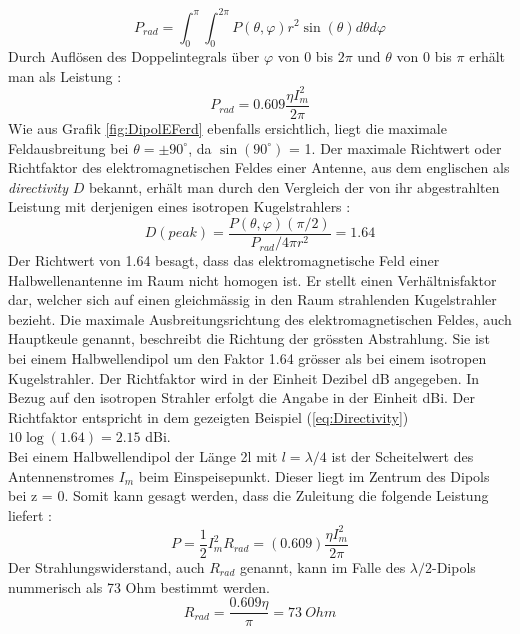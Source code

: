 \begin{equation}
P_{rad}=\int_0^{\pi} \int_0^{2\pi} P(\theta,\varphi)r^2\sin(\theta) d\theta d\varphi
\end{equation}
Durch Auflösen des Doppelintegrals über $\varphi$ von 0 bis $2\pi$ und $\theta$ von 0 bis $\pi$ erhält man als Leistung \cite{elliott1981antenna}:
\begin{equation}
P_{rad}=0.609 \frac{\eta I_{m}^{2}}{2\pi}
\end{equation}
Wie aus Grafik \ref{fig:DipolEFerd} ebenfalls ersichtlich, liegt die maximale Feldausbreitung bei $\theta =\pm 90 ^\circ $, da $\sin(90^\circ)  $ = 1.
Der maximale Richtwert oder Richtfaktor des elektromagnetischen Feldes einer Antenne, aus dem englischen als \textit{directivity} $D$ bekannt, erhält man durch den Vergleich der von ihr abgestrahlten Leistung mit derjenigen eines isotropen Kugelstrahlers \cite{elliott1981antenna}:
\begin{equation}
D(peak)=\frac{P(\theta,\varphi)(\pi/2)}{P_{rad}/ 4 \pi r^{2}} =1.64
\label{eq:Directivity}
\end{equation}
Der Richtwert von 1.64 besagt, dass das elektromagnetische Feld einer Halbwellenantenne im Raum nicht homogen ist. Er stellt einen Verhältnisfaktor dar, welcher sich auf einen gleichmässig in den Raum strahlenden Kugelstrahler bezieht. Die maximale Ausbreitungsrichtung des elektromagnetischen Feldes, auch Hauptkeule genannt, beschreibt die Richtung der grössten Abstrahlung. Sie ist bei einem Halbwellendipol um den Faktor 1.64 grösser als bei einem isotropen Kugelstrahler. Der Richtfaktor wird in der Einheit Dezibel dB angegeben. In Bezug auf den isotropen Strahler erfolgt die Angabe in der Einheit dBi. Der Richtfaktor entspricht in dem gezeigten Beispiel (\ref{eq:Directivity}) $10\log{(1.64)}=2.15$ dBi.\\
Bei einem Halbwellendipol der Länge 2l mit $l=\lambda/4 $ ist der Scheitelwert des Antennenstromes $I_{m}$ beim Einspeisepunkt. Dieser liegt im Zentrum des Dipols bei z = 0. Somit kann gesagt werden, dass die Zuleitung die folgende Leistung liefert \cite{Emant}:
\begin{equation}
P=\frac{1}{2} I_{m}^{2}R_{rad}=(0.609)\frac{\eta I_{m}^{2}}{2\pi}
\end{equation}
Der Strahlungswiderstand, auch $R_{rad}$ genannt, kann im Falle des $\lambda /2$-Dipols nummerisch als 73 Ohm bestimmt werden.
\begin{equation}\label{RradDipol}
R_{rad}=\frac{0.609 \eta}{\pi}= 73 \ Ohm
\end{equation}
